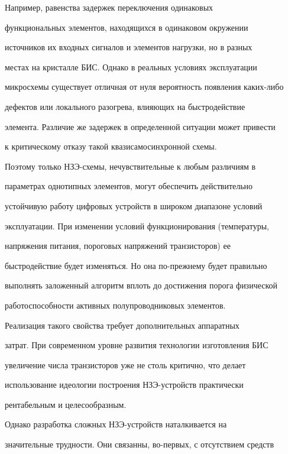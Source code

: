 Например, равенства задержек переключения одинаковых


функциональных элементов, находящихся в одинако\-вом окружении


источников их входных сигналов и элементов нагрузки, но в разных


местах на кристалле БИС. Однако в реальных условиях эксплуатации


микросхемы существует отличная от нуля вероятность появления каких-либо 


дефектов или локального разогрева, влияющих на быстродействие


элемента. Различие же задержек в определенной ситуации может привести


к критическому отказу такой квазисамосинхронной схемы.





   Поэтому только НЗЭ-схе\-мы, нечувствительные к любым различиям в


параметрах однотипных элементов, могут обеспечить действительно


устойчивую работу цифровых устройств в широком диапазоне условий


эксплуатации. При изменении условий функционирования (температуры,


напряжения питания, пороговых напряжений транзисторов) ее


быстродействие будет изменяться. Но она по-прежнему будет правильно


выполнять заложенный алгоритм вплоть до достижения порога физической


работоспособности активных полупроводниковых элементов.





   Реализация такого свойства требует дополнительных аппаратных


затрат. При современном уровне развития технологии изготовления БИС


увеличение числа транзисторов уже не столь критично, что делает


использование идеологии построения НЗЭ-устройств практически


рентабельным и целесообразным.





   Однако разработка сложных НЗЭ-устройств наталкивается на


значительные трудности. Они связанны, во-первых, с отсутствием средств


